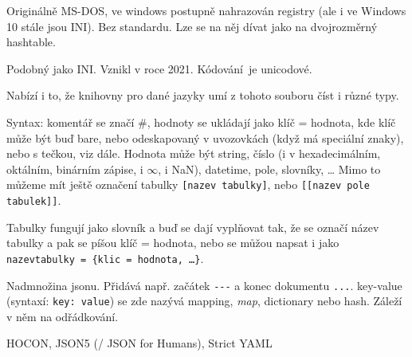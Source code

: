 \documentclass[12pt]{article}					%
\begin{document}
\begin{definice}
	Originálně MS-DOS, ve windows postupně nahrazován registry (ale i ve Windows 10 stále jsou INI). Bez standardu. Lze se na něj dívat jako na dvojrozměrný hashtable.
\end{definice}

\begin{definice}[TOML]
	Podobný jako INI. Vznikl v roce 2021. Kódování je unicodové. 

	Nabízí i to, že knihovny pro dané jazyky umí z tohoto souboru číst i různé typy.

	Syntax: komentář se značí \#, hodnoty se ukládají jako klíč = hodnota, kde klíč může být buď bare, nebo odeskapovaný v uvozovkách (když má speciální znaky), nebo s tečkou, viz dále. Hodnota může být string, číslo (i v hexadecimálním, oktálním, binárním zápise, i $∞$, i NaN), datetime, pole, slovníky, … Mimo to můžeme mít ještě označení tabulky \verb|[nazev tabulky]|, nebo \verb|[[nazev pole tabulek]]|.

	Tabulky fungují jako slovník a buď se dají vyplňovat tak, že se označí název tabulky a pak se píšou klíč = hodnota, nebo se můžou napsat i jako \verb|nazevtabulky = {klic = hodnota, …}|.
\end{definice}

\begin{definice}[YAML]
	Nadmnožina jsonu. Přidává např. začátek \verb|---| a konec dokumentu \verb|...|. key-value (syntaxí: \verb|key: value|) se zde nazývá mapping, \emph{map}, dictionary nebo hash. Záleží v něm na odřádkování.
\end{definice}

\begin{poznamka}
	HOCON, JSON5 (/ JSON for Humans), Strict YAML
\end{poznamka}
\end{document}
